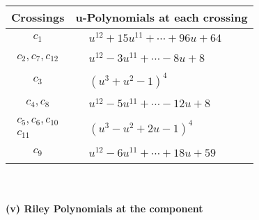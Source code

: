 \documentclass[1p]{elsarticle_modified}
\theoremstyle{definition}
\begin{document}
\begin{tabular}{m{50pt}|m{274pt}}
Crossings & \hspace{64pt}u-Polynomials at each crossing \\
\hline $$\begin{aligned}c_{1}\end{aligned}$$&$\begin{aligned}
&u^{12}+15 u^{11}+\cdots+96 u+64
\end{aligned}$\\
\hline $$\begin{aligned}c_{2},c_{7},c_{12}\end{aligned}$$&$\begin{aligned}
&u^{12}-3 u^{11}+\cdots-8 u+8
\end{aligned}$\\
\hline $$\begin{aligned}c_{3}\end{aligned}$$&$\begin{aligned}
&(u^3+u^2-1)^4
\end{aligned}$\\
\hline $$\begin{aligned}c_{4},c_{8}\end{aligned}$$&$\begin{aligned}
&u^{12}-5 u^{11}+\cdots-12 u+8
\end{aligned}$\\
\hline $$\begin{aligned}c_{5},c_{6},c_{10}\\c_{11}\end{aligned}$$&$\begin{aligned}
&(u^3- u^2+2 u-1)^4
\end{aligned}$\\
\hline $$\begin{aligned}c_{9}\end{aligned}$$&$\begin{aligned}
&u^{12}-6 u^{11}+\cdots+18 u+59
\end{aligned}$\\
\hline
\end{tabular}\\~\\
\newpage\renewcommand{\arraystretch}{1}
\flushleft \textbf{(v) Riley Polynomials at the component}\newline \\
\end{document}
